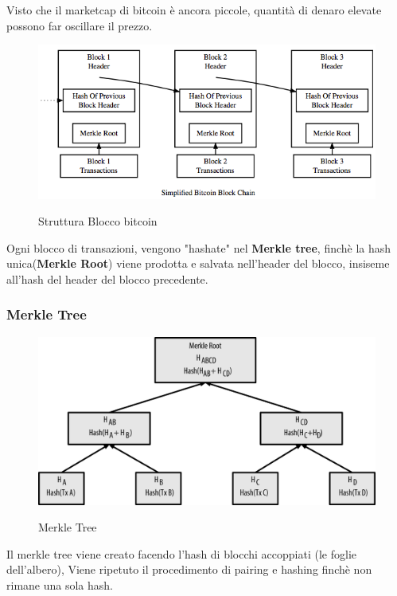 Visto che il marketcap di bitcoin è ancora piccole, quantità di denaro elevate possono far oscillare il prezzo.



\begin{figure}[h!]
    \centering
    \includegraphics[width=0.5\linewidth]{imgs/15 - bitcoin block.png}
    \label{fig:bitcoin_block}
    \caption{Struttura Blocco bitcoin}
\end{figure}

Ogni blocco di transazioni, vengono "hashate" nel \textbf{Merkle tree}, finchè la hash unica(\textbf{Merkle Root}) 
viene prodotta e salvata nell'header del blocco, insiseme all'hash del header del blocco precedente.

\subsubsection{Merkle Tree}

\begin{figure}[h!]
    \centering
    \includegraphics[width=0.5\linewidth]{imgs/16 - merkle tree.png}
    \label{fig:merkle_tree}
    \caption{Merkle Tree}
\end{figure}


Il merkle tree viene creato facendo l'hash di blocchi accoppiati (le foglie dell'albero),
Viene ripetuto il procedimento di pairing e hashing finchè non rimane una sola hash.


